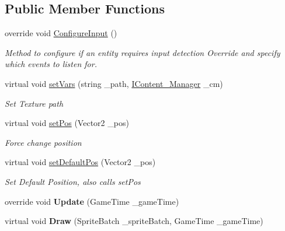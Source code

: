 \subsection*{Public Member Functions}
\begin{DoxyCompactItemize}
\item 
override void \mbox{\hyperlink{class_g_m_t_b_1_1_entities_1_1_physical_entity_ac8ffd1ce4e40a17980f70b97e941451c}{Configure\+Input}} ()
\begin{DoxyCompactList}\small\item\em Method to configure if an entity requires input detection Override and specify which events to listen for. \end{DoxyCompactList}\item 
virtual void \mbox{\hyperlink{class_g_m_t_b_1_1_entities_1_1_physical_entity_add277bab26367c3364210b3577f6d7cd}{set\+Vars}} (string \+\_\+path, \mbox{\hyperlink{interface_g_m_t_b_1_1_interfaces_1_1_i_content___manager}{I\+Content\+\_\+\+Manager}} \+\_\+cm)
\begin{DoxyCompactList}\small\item\em Set Texture path \end{DoxyCompactList}\item 
virtual void \mbox{\hyperlink{class_g_m_t_b_1_1_entities_1_1_physical_entity_af0d908be428b69c35e3d8707cf25e298}{set\+Pos}} (Vector2 \+\_\+pos)
\begin{DoxyCompactList}\small\item\em Force change position \end{DoxyCompactList}\item 
virtual void \mbox{\hyperlink{class_g_m_t_b_1_1_entities_1_1_physical_entity_a385d1513107094da5ca2955e91a44bb6}{set\+Default\+Pos}} (Vector2 \+\_\+pos)
\begin{DoxyCompactList}\small\item\em Set Default Position, also calls set\+Pos \end{DoxyCompactList}\item 
\mbox{\label{class_g_m_t_b_1_1_entities_1_1_physical_entity_ac93eb5a13167dedd3260903c96ff73d0}} 
override void {\bfseries Update} (Game\+Time \+\_\+game\+Time)
\item 
\mbox{\label{class_g_m_t_b_1_1_entities_1_1_physical_entity_a61103ba37b0152438728b0919604bfd8}} 
virtual void {\bfseries Draw} (Sprite\+Batch \+\_\+sprite\+Batch, Game\+Time \+\_\+game\+Time)

\end{DoxyCompactItemize}
